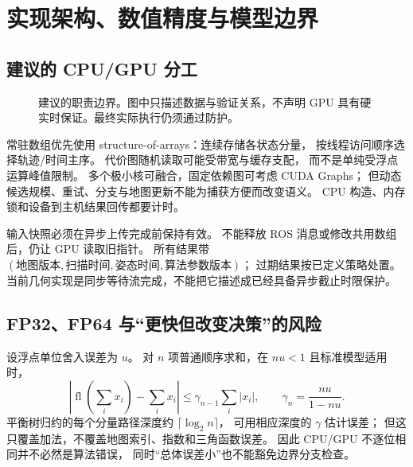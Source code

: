 \section{实现架构、数值精度与模型边界}
\subsection{建议的 CPU/GPU 分工}
\begin{figure}[htbp]
\centering
{}
\caption{建议的职责边界。图中只描述数据与验证关系，不声明 GPU 具有硬实时保证。最终实际执行仍须通过防护。}
\end{figure}
常驻数组优先使用 structure-of-arrays：连续存储各状态分量，
按线程访问顺序选择轨迹/时间主序。
代价图随机读取可能受带宽与缓存支配，
而不是单纯受浮点运算峰值限制。
多个极小核可融合，固定依赖图可考虑 CUDA Graphs；
但动态候选规模、重试、分支与地图更新不能为捕获方便而改变语义。
CPU 构造、内存锁和设备到主机结果回传都要计时。

输入快照必须在异步上传完成前保持有效。
不能释放 ROS 消息或修改共用数组后，仍让 GPU 读取旧指针。
所有结果带 $(\text{地图版本},\text{扫描时间},\text{姿态时间},\text{算法参数版本})$；
过期结果按已定义策略处置。
当前几何实现是同步等待流完成，不能把它描述成已经具备异步截止时限保护。

\subsection{FP32、FP64 与“更快但改变决策”的风险}
设浮点单位舍入误差为 $u$。
对 $n$ 项普通顺序求和，在 $nu<1$ 且标准模型适用时，
\[
|\operatorname{fl}(\sum_i x_i)-\sum_ix_i|
\le\gamma_{n-1}\sum_i|x_i|,\qquad
\gamma_n=\frac{nu}{1-nu}.
\]
平衡树归约的每个分量路径深度约 $\lceil\log_2n\rceil$，
可用相应深度的 $\gamma$ 估计误差；
但这只覆盖加法，不覆盖地图索引、指数和三角函数误差。
因此 CPU/GPU 不逐位相同并不必然是算法错误，
同时“总体误差小”也不能豁免边界分支检查。

